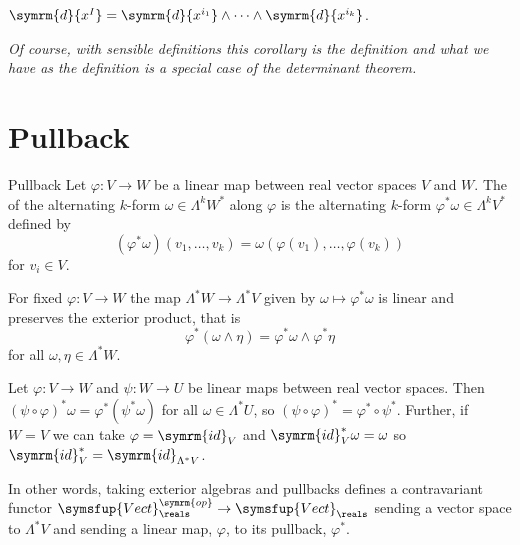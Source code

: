 \documentclass[fleqn]{NotesClass}
\makeatletter
\renewcommand{\dl}{\symrm{d}}
\newcommand{\id}{\symrm{id}}
\newcommand{\c@egory}{\symsfup}
\newcommand{\Vect}[1][\field]{\c@egory{Vect}_{#1}}
\newcommand{\op}{\symrm{op}}
\makeatother
\begin{document}
    \begin{crl}{}{}
        \(\dl{x^I} = \dl{x^{i_1}} \wedge \dotsb \wedge \dl{x^{i_k}}\).
    \end{crl}
    \textit{Of course, with sensible definitions this corollary is the definition and what we have as the definition is a special case of the determinant theorem.}
    
    \section{Pullback}
    \begin{dfn}{Pullback}{}
        Let \(\varphi \colon V \to W\) be a linear map between real vector spaces \(V\) and \(W\).
        The  of the alternating \(k\)-form \(\omega \in \Lambda^kW^*\) along \(\varphi\) is the alternating \(k\)-form \(\varphi^*\omega \in \Lambda^kV^*\) defined by
        \begin{equation}
            (\varphi^*\omega)(v_1, \dotsc, v_k) = \omega(\varphi(v_1), \dotsc, \varphi(v_k))
        \end{equation}
        for \(v_i \in V\).
    \end{dfn}
    
    \begin{lma}{}{}
        For fixed \(\varphi \colon V \to W\) the map \(\Lambda^* W \to \Lambda^* V\) given by \(\omega \mapsto \varphi^* \omega\) is linear and preserves the exterior product, that is
        \begin{equation}
            \varphi^*(\omega \wedge \eta) = \varphi^*\omega \wedge \varphi^*\eta
        \end{equation}
        for all \(\omega, \eta \in \Lambda^*W\).
   \end{lma}
   \begin{lma}{}{}
        Let \(\varphi \colon V \to W\) and \(\psi \colon W \to U\) be linear maps between real vector spaces.
        Then \((\psi \circ \varphi)^*\omega = \varphi^*(\psi^*\omega)\) for all \(\omega \in \Lambda^*U\), so \((\psi \circ \varphi)^* = \varphi^* \circ \psi^*\).
        Further, if \(W = V\) we can take \(\varphi = \id_V\) and \(\id_V^*\omega = \omega\) so \(\id_V^* = \id_{\Lambda^*V}\).
        
        In other words, taking exterior algebras and pullbacks defines a contravariant functor \(\Vect[\reals]^{\op} \to \Vect[\reals]\) sending a vector space to \(\Lambda^* V\) and sending a linear map, \(\varphi\), to its pullback, \(\varphi^*\).
    \end{lma}
    
\end{document}
